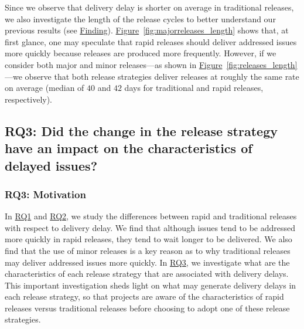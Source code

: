 \noindent\DIFdelbegin \textit{\textbf{}%
}%
\DIFdelend \DIFaddbegin {} \DIFaddend Since we
observe that delivery delay is shorter on average in traditional releases, we
also investigate the length of the release cycles to better understand our
previous results (see \DIFdelbegin %
\DIFdel{~\ref{obs:2}}\DIFdelend \DIFaddbegin \hyperref[find19]{Finding}\DIFadd{~\ref{find19}}\DIFaddend ).
\hyperref[fig:majorreleases_length]{Figure}~\ref{fig:majorreleases_length} shows
that, at first glance, one may speculate that rapid releases should deliver
addressed issues more quickly because releases are produced more frequently.
However, if we consider both major and minor releases---as shown in
\hyperref[fig:releases_length]{Figure}~\ref{fig:releases_length}---we observe
that both release strategies deliver releases at roughly the same rate on
average (median of $40$ and $42$ days for traditional and rapid releases,
respectively).\\


\subsection{RQ3: Did the change in the release strategy have an impact on
the characteristics of delayed issues?}\label{ch5:rq3} 

\subsubsection*{RQ3: Motivation}

In \hyperref[ch5:rq1]{RQ1} and \hyperref[ch5:rq2]{RQ2}, we study the differences
between rapid and traditional releases with respect to delivery delay. We find
that although issues tend to be addressed more quickly in rapid releases, they
tend to wait longer to be delivered. We also find that the use of minor releases
is a key reason as to why traditional releases may deliver addressed issues more
quickly. In \hyperref[ch4:rq3]{RQ3}, we investigate what are the characteristics
of each release strategy that are associated with delivery delays. This
important investigation sheds light on what may generate delivery delays in each
release strategy, so that projects are aware of the characteristics of rapid
releases versus traditional releases before choosing to adopt one of these
release strategies. 

